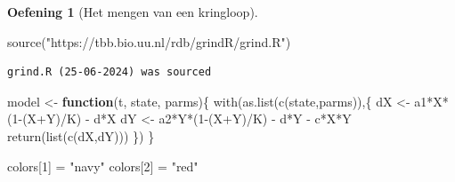 \documentclass[
  a4paper,
]{scrbook}
\newenvironment{Shaded}{\begin{snugshade}}{\end{snugshade}}
\newcommand{\ControlFlowTok}[1]{\textcolor[rgb]{0.00,0.23,0.31}{\textbf{#1}}}
\newcommand{\DecValTok}[1]{\textcolor[rgb]{0.68,0.00,0.00}{#1}}
\newcommand{\FunctionTok}[1]{\textcolor[rgb]{0.28,0.35,0.67}{#1}}
\newcommand{\NormalTok}[1]{\textcolor[rgb]{0.00,0.23,0.31}{#1}}
\newcommand{\OtherTok}[1]{\textcolor[rgb]{0.00,0.23,0.31}{#1}}
\newcommand{\SpecialCharTok}[1]{\textcolor[rgb]{0.37,0.37,0.37}{#1}}
\newcommand{\StringTok}[1]{\textcolor[rgb]{0.13,0.47,0.30}{#1}}
\theoremstyle{definition}
\newtheorem{exercise}{Oefening}[chapter]
\theoremstyle{remark}
\begin{document}
\begin{exercise}[Het mengen van een
kringloop]
\begin{tcolorbox}
\begin{Shaded}
\begin{Highlighting}[]
\FunctionTok{source}\NormalTok{(}\StringTok{"https://tbb.bio.uu.nl/rdb/grindR/grind.R"}\NormalTok{)}
\end{Highlighting}
\end{Shaded}

\begin{verbatim}
grind.R (25-06-2024) was sourced
\end{verbatim}

\begin{Shaded}
\begin{Highlighting}[]
\NormalTok{model }\OtherTok{\textless{}{-}} \ControlFlowTok{function}\NormalTok{(t, state, parms)\{}
  \FunctionTok{with}\NormalTok{(}\FunctionTok{as.list}\NormalTok{(}\FunctionTok{c}\NormalTok{(state,parms)),\{}
\NormalTok{    dX }\OtherTok{\textless{}{-}}\NormalTok{ a1}\SpecialCharTok{*}\NormalTok{X}\SpecialCharTok{*}\NormalTok{(}\DecValTok{1}\SpecialCharTok{{-}}\NormalTok{(X}\SpecialCharTok{+}\NormalTok{Y)}\SpecialCharTok{/}\NormalTok{K) }\SpecialCharTok{{-}}\NormalTok{ d}\SpecialCharTok{*}\NormalTok{X}
\NormalTok{    dY }\OtherTok{\textless{}{-}}\NormalTok{ a2}\SpecialCharTok{*}\NormalTok{Y}\SpecialCharTok{*}\NormalTok{(}\DecValTok{1}\SpecialCharTok{{-}}\NormalTok{(X}\SpecialCharTok{+}\NormalTok{Y)}\SpecialCharTok{/}\NormalTok{K) }\SpecialCharTok{{-}}\NormalTok{ d}\SpecialCharTok{*}\NormalTok{Y }\SpecialCharTok{{-}}\NormalTok{ c}\SpecialCharTok{*}\NormalTok{X}\SpecialCharTok{*}\NormalTok{Y}
    \FunctionTok{return}\NormalTok{(}\FunctionTok{list}\NormalTok{(}\FunctionTok{c}\NormalTok{(dX,dY)))}
\NormalTok{  \})}
\NormalTok{\}  }

\NormalTok{colors[}\DecValTok{1}\NormalTok{] }\OtherTok{=} \StringTok{"navy"}
\NormalTok{colors[}\DecValTok{2}\NormalTok{] }\OtherTok{=} \StringTok{"red"}


\end{Highlighting}
\end{Shaded}
\end{tcolorbox}
\end{exercise}
\end{document}
